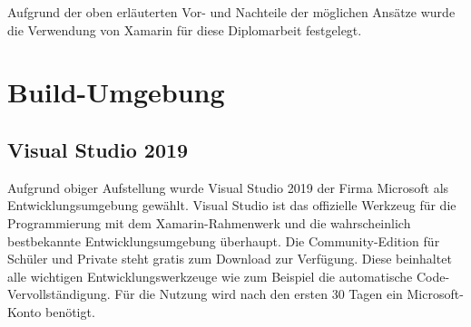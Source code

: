 Aufgrund der oben erläuterten Vor- und Nachteile der möglichen Ansätze wurde die Verwendung von Xamarin für diese Diplomarbeit festgelegt.

\section{Build-Umgebung}
\subsection{Visual Studio 2019}
Aufgrund obiger Aufstellung wurde Visual Studio 2019 der Firma Microsoft als Entwicklungsumgebung gewählt.
Visual Studio ist das offizielle Werkzeug für die Programmierung mit dem Xamarin-Rahmenwerk und die wahrscheinlich bestbekannte Entwicklungsumgebung überhaupt.
Die Community-Edition für Schüler und Private steht gratis zum Download zur Verfügung.
Diese beinhaltet alle wichtigen Entwicklungswerkzeuge wie zum Beispiel die automatische Code-Vervollständigung.
Für die Nutzung wird nach den ersten 30 Tagen ein Microsoft-Konto benötigt.\par

